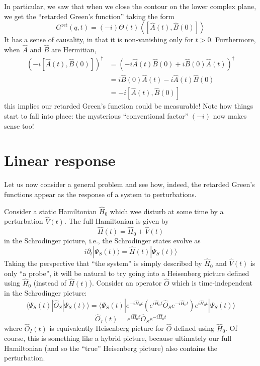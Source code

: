 In particular, we saw that when we close the contour on the lower complex plane, we get the ``retarded Green's function'' taking the form
\[ G^{\mathrm{ret}}\left( q,t \right) =\left( -i \right) \Theta \left( t \right) \left< \left[ \hat{A}\left( t \right) ,\hat{B}\left( 0 \right) \right] \right> \]
It has a sense of causality, in that it is non-vanishing only for $t>0$. Furthermore, when $\hat{A}$ and $\hat{B}$ are Hermitian,
\begin{align*}
    \left( -i\left[ \hat{A}\left( t \right) ,\hat{B}\left( 0 \right) \right] \right) ^{\dagger}&=\left( -i\hat{A}\left( t \right) \hat{B}\left( 0 \right) +i\hat{B}\left( 0 \right) \hat{A}\left( t \right) \right) ^{\dagger}\\
    &=i\hat{B}\left( 0 \right) \hat{A}\left( t \right) -i\hat{A}\left( t \right) \hat{B}\left( 0 \right) \\
    &=-i\left[ \hat{A}\left( t \right) ,\hat{B}\left( 0 \right) \right]
\end{align*}
this implies our retarded Green's function could be measurable! Note how things start to fall into place: the mysterious ``conventional factor'' $(-i)$ now makes sense too!

\section{Linear response}

Let us now consider a general problem and see how, indeed, the retarded Green's functions appear as the response of a system to perturbations.

Consider a static Hamiltonian $\hat{H}_0$ which wee disturb at some time by a perturbation $\hat{V}(t)$. The full Hamiltonian is given by
\[ \hat{H}\left( t \right) =\hat{H}_0+\hat{V}\left( t \right) \]
in the Schrodinger picture, i.e., the Schrodinger states evolve as
\[ i\partial _t|\Psi_S \left( t \right) \rangle=\hat{H}\left( t \right) |\Psi_S \left( t \right) \rangle\]
Taking the perspective that ``the system'' is simply described by $\hat{H}_0$ and $\hat{V}(t)$ is only ``a probe'', it will be natural to try going into a Heisenberg picture defined using $\hat{H}_0$ (instead of $\hat{H}(t)$). Consider an operator $\hat{O}$ which is time-independent in the Schrodinger picture:
\[ \langle \Psi_S \left( t \right) |\hat{O}_S|\Psi_S \left( t \right) \rangle =\langle \Psi_S \left( t \right) |e^{-i\hat{H}_0t}\left( e^{i\hat{H}_0t}\hat{O}_Se^{-i\hat{H}_0t} \right) e^{i\hat{H}_0t}|\Psi_S \left( t \right) \rangle\]
\[ \hat{O}_I\left( t \right) =e^{i\hat{H}_0t}\hat{O}_Se^{-i\hat{H}_0t}\]
where $\hat{O}_I(t)$ is equivalently Heisenberg picture for $\hat{O}$ defined using $\hat{H}_0$. Of course, this is something like a hybrid picture, because ultimately our full Hamiltonian (and so the ``true'' Heisenberg picture) also contains the perturbation.

